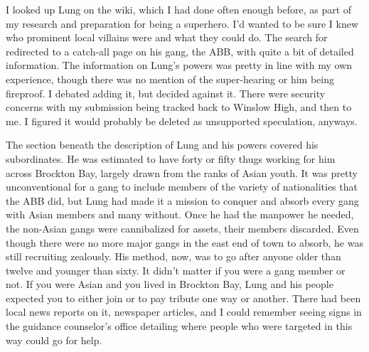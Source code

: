 I looked up Lung on the wiki, which I had done often enough before, as part of my research and preparation for being a superhero. I'd wanted to be sure I knew who prominent local villains were and what they could do. The search for  redirected to a catch-all page on his gang, the ABB, with quite a bit of detailed information. The information on Lung's powers was pretty in line with my own experience, though there was no mention of the super-hearing or him being fireproof. I debated adding it, but decided against it. There were security concerns with my submission being tracked back to Winslow High, and then to me. I figured it would probably be deleted as unsupported speculation, anyways.

The section beneath the description of Lung and his powers covered his subordinates. He was estimated to have forty or fifty thugs working for him across Brockton Bay, largely drawn from the ranks of Asian youth. It was pretty unconventional for a gang to include members of the variety of nationalities that the ABB did, but Lung had made it a mission to conquer and absorb every gang with Asian members and many without. Once he had the manpower he needed, the non-Asian gangs were cannibalized for assets, their members discarded. Even though there were no more major gangs in the east end of town to absorb, he was still recruiting zealously. His method, now, was to go after anyone older than twelve and younger than sixty. It didn't matter if you were a gang member or not. If you were Asian and you lived in Brockton Bay, Lung and his people expected you to either join or to pay tribute one way or another. There had been local news reports on it, newspaper articles, and I could remember seeing signs in the guidance counselor's office detailing where people who were targeted in this way could go for help.


